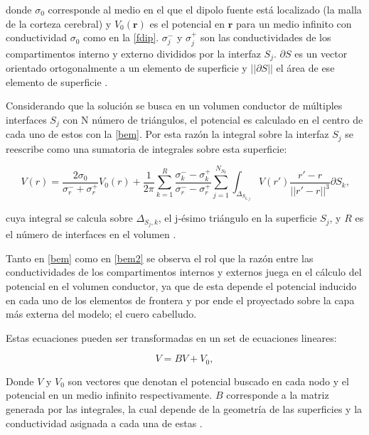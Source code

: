 donde $\sigma_{0}$ corresponde al medio en el que el dipolo fuente está localizado (la malla de la corteza cerebral) y $V_{0}(\mathbf{r})$ es el potencial en $\mathbf{r}$ para un medio infinito con conductividad $\sigma_{0}$ como en la \cref{fdip}. $\sigma_{j}^{-}$ y $\sigma_{j}^{+}$ son las conductividades de los compartimentos interno y externo divididos por la interfaz $S_{j}$. $\partial S$ es un vector orientado ortogonalmente a un elemento de superficie y $||\partial S||$ el área de ese elemento de superficie \cite{Hallez2007}. 

Considerando que la solución se busca en un volumen conductor de múltiples interfaces $S_{j}$ con N número de triángulos, el potencial es calculado en el centro de cada uno de estos con la \cref{bem}. Por esta razón la integral sobre la interfaz $S_{j}$ se reescribe como una sumatoria de integrales sobre esta superficie:

\begin{equation}
	\label{bem2}
	V(r) = \frac{2\sigma_{0}}{\sigma_{r}^{-} + {\sigma_{r}^{+}}} V_{0}(r) + \frac{1}{2\pi} \sum_{k=1}^{R}\frac{\sigma_{k}^{-}-\sigma_{k}^{+}}{\sigma_{r}^{-}-\sigma_{r}^{+}} \sum_{j=1}^{N_{S_{k}}} \int_{\Delta_{S_{k,j}}} V(r') \frac{r'-r}{||r'-r||^3}\partial S_{k}\text{,}
\end{equation}

cuya integral se calcula sobre $\Delta_{S_{j},k}$, el j-ésimo triángulo en la superficie $S_{j}$, y $R$ es el número de interfaces en el volumen \cite{Hallez2007}. 

Tanto en \cref{bem} como en \cref{bem2} se observa el rol que la razón entre las conductividades de los compartimentos internos y externos juega en el cálculo del potencial en el volumen conductor, ya que de esta depende el potencial inducido en cada uno de los elementos de frontera y por ende el proyectado sobre la capa más externa del modelo; el cuero cabelludo.

Estas ecuaciones pueden ser transformadas en un set de ecuaciones lineares:

\begin{equation}
	\label{lineal}
	V = BV + V_{0},
\end{equation}

Donde $V$ y $V_{0}$ son vectores que denotan el potencial buscado en cada nodo y el potencial en un medio infinito respectivamente. $B$ corresponde a la matriz generada por las integrales, la cual depende de la geometría de las superficies y la conductividad asignada a cada una de estas \cite{Hallez2007}.

